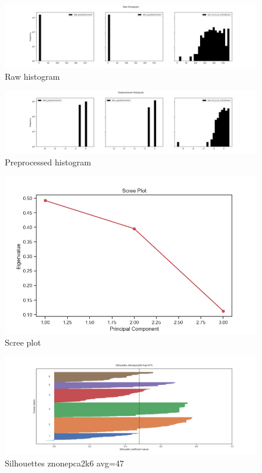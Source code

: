 \documentclass{article}
\begin{document}
\begin{figure}[H]
    \centering
    \includegraphics[width=1\columnwidth]{Crystal/feedback_logtransform_zNonepca2k6/Raw Histogram.png}
    \caption{Raw histogram}
    \label{fig:Crystalfeedbackrawhistogram}
\end{figure}
\begin{figure}[H]
    \centering
    \includegraphics[width=1\columnwidth]{Crystal/feedback_logtransform_zNonepca2k6/Preprocessed Histogram.png}
    \caption{Preprocessed histogram}
    \label{fig:Crystalfeedbackpreprocessedhistogram}
\end{figure}
\begin{figure}[H]
    \centering
    \includegraphics[width=1\columnwidth]{Crystal/feedback_logtransform_zNonepca2k6/Scree Plot.png}
    \caption{Scree plot}
    \label{fig:Crystalfeedbackscreeplot}
\end{figure}
\begin{figure}[H]
    \centering
    \includegraphics[width=1\columnwidth]{Crystal/feedback_logtransform_zNonepca2k6/Silhouettes zNonepca2k6 Avg=47.png}
    \caption{Silhouettes znonepca2k6 avg=47}
    \label{fig:Crystalfeedbacksilhouettesznonepca2k6avg=47}
\end{figure}
\end{document}
